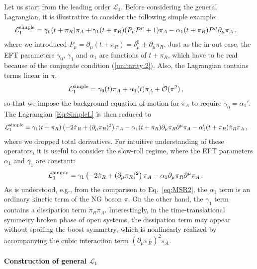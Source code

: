 \documentclass[a4paper,11pt]{article}
\begin{document}
Let us start from the leading order $\mathcal{L}_1$. Before considering the general Lagrangian, it is illustrative to consider the following simple example:
\begin{align}
\mathcal{L}_1^{\rm simple}&=
\gamma_0(t+\pi_R)\pi_A
+\gamma_1(t+\pi_R)(P_\mu P^\mu+1)\pi_A
 -\alpha_1(t+\pi_R)P^\mu\partial_\mu\pi_A\,,
 \label{Eq:SimpleL}
\end{align}
where we introduced 
$P_\mu=\partial_\mu(t+\pi_R)=\delta_\mu^0+\partial_\mu\pi_R$. 
Just as the in-out case, the EFT parameters $\gamma_0$, $\gamma_1$ 
and $\alpha_1$ are functions of $t+\pi_R$, which have to be real 
because of the conjugate condition (\ref{unitarity:2}). 
Also, the Lagrangian contains terms linear in $\pi$, 
\begin{align}
\mathcal{L}_1^{\rm simple}&=\gamma_0(t)\pi_A+\alpha_1(t)\dot{\pi}_A+\mathcal{O}(\pi^2)\,,
\end{align}
so that we impose the background equation of motion for $\pi_A$
to require $\gamma_0=\alpha_1'$. The Lagrangian \eqref{Eq:SimpleL} is 
then reduced to
\begin{align}
\mathcal{L}_1^{\rm simple}
&=
\gamma_1(t+\pi_R)\left(-2\dot{\pi}_R+(\partial_\mu\pi_R)^2\right)\pi_A
-\alpha_1(t+\pi_R)\partial_\mu\pi_R\partial^\mu\pi_A
-\alpha_1'(t+\pi_R)\dot{\pi}_R\pi_A\,,
\end{align}
where we dropped total derivatives. 
For intuitive understanding of these operators, it is useful to consider the slow-roll regime, where the EFT parameters $\alpha_1$ and $\gamma_1$ are constant:
\begin{align}
\mathcal{L}_1^{\rm simple}
&=
\gamma_1\left(-2\dot{\pi}_R+(\partial_\mu\pi_R)^2\right)\pi_A
-\alpha_1\partial_\mu\pi_R\partial^\mu\pi_A\,.
\end{align}
As is understood, e.g., from the comparison to Eq.~\eqref{eq:MSR2}, the $\alpha_1$ term is an ordinary kinetic term of the NG boson $\pi$. On the other hand, the $\gamma_1$ term contains a dissipation term $\dot{\pi}_R\pi_A$. Interestingly, in the time-translational symmetry broken phase of open systems, the dissipation term may appear without spoiling the boost symmetry, which is nonlinearly realized by accompanying the cubic interaction term $(\partial_\mu\pi_R)^2\pi_A$.


\paragraph{Construction of general $\mathcal{L}_1$}
\end{document}
